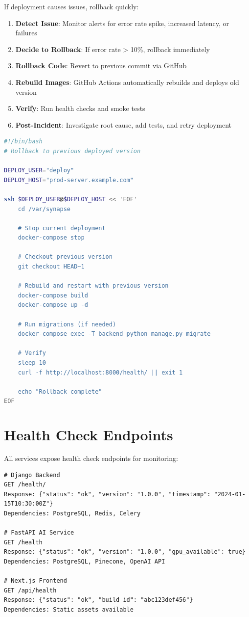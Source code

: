\documentclass{report}
\begin{document}
If deployment causes issues, rollback quickly:

\begin{enumerate}
  \item \textbf{Detect Issue}: Monitor alerts for error rate spike, increased latency, or failures
  \item \textbf{Decide to Rollback}: If error rate > 10\%, rollback immediately
  \item \textbf{Rollback Code}: Revert to previous commit via GitHub
  \item \textbf{Rebuild Images}: GitHub Actions automatically rebuilds and deploys old version
  \item \textbf{Verify}: Run health checks and smoke tests
  \item \textbf{Post-Incident}: Investigate root cause, add tests, and retry deployment
\end{enumerate}

\begin{lstlisting}[language=bash, caption=Manual Rollback Script]
#!/bin/bash
# Rollback to previous deployed version

DEPLOY_USER="deploy"
DEPLOY_HOST="prod-server.example.com"

ssh $DEPLOY_USER@$DEPLOY_HOST << 'EOF'
    cd /var/synapse
    
    # Stop current deployment
    docker-compose stop
    
    # Checkout previous version
    git checkout HEAD~1
    
    # Rebuild and restart with previous version
    docker-compose build
    docker-compose up -d
    
    # Run migrations (if needed)
    docker-compose exec -T backend python manage.py migrate
    
    # Verify
    sleep 10
    curl -f http://localhost:8000/health/ || exit 1
    
    echo "Rollback complete"
EOF
\end{lstlisting}

\section{Health Check Endpoints}

All services expose health check endpoints for monitoring:

\begin{lstlisting}[caption=Health Check Endpoints Reference]
# Django Backend
GET /health/
Response: {"status": "ok", "version": "1.0.0", "timestamp": "2024-01-15T10:30:00Z"}
Dependencies: PostgreSQL, Redis, Celery

# FastAPI AI Service
GET /health
Response: {"status": "ok", "version": "1.0.0", "gpu_available": true}
Dependencies: PostgreSQL, Pinecone, OpenAI API

# Next.js Frontend
GET /api/health
Response: {"status": "ok", "build_id": "abc123def456"}
Dependencies: Static assets available
\end{lstlisting}
\end{document}
